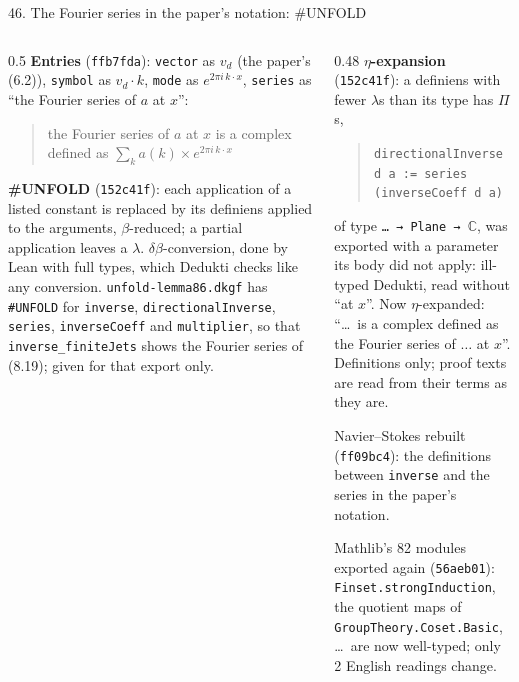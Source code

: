 \documentclass[10pt,aspectratio=169]{beamer}
\newcommand{\bad}[1]{\textcolor{warn}{#1}}
\newcommand{\ok}[1]{\textcolor{good}{#1}}
\newcommand{\commit}[1]{\texttt{\footnotesize #1}}
\begin{document}
\begin{frame}{46. The Fourier series in the paper's notation: \#UNFOLD}
  \scriptsize
  \begin{columns}[T]
    \begin{column}{0.5\textwidth}
      \textbf{Entries} (\commit{ffb7fda}): \texttt{vector} as $v_d$ (the paper's (6.2)),
      \texttt{symbol} as $v_d \cdot k$, \texttt{mode} as $e^{2\pi i\, k \cdot x}$,
      \texttt{series} as ``the Fourier series of $a$ at $x$'':
      \begin{quote}
        \ok{the Fourier series of $a$ at $x$ is a complex defined as
        $\sum_k a(k) \times e^{2\pi i\, k \cdot x}$}
      \end{quote}
      \textbf{\#UNFOLD} (\commit{152c41f}): each application of a listed constant is replaced by
      its definiens applied to the arguments, $\beta$-reduced; a partial application leaves a
      $\lambda$. $\delta\beta$-conversion, done by Lean with full types, which Dedukti checks like
      any conversion. \texttt{unfold-lemma86.dkgf} has \texttt{\#UNFOLD} for \texttt{inverse},
      \texttt{directionalInverse}, \texttt{series}, \texttt{inverseCoeff} and
      \texttt{multiplier}, so that \texttt{inverse\_finiteJets} shows the Fourier series of (8.19); given for that
      export only.
    \end{column}
    \begin{column}{0.48\textwidth}
      \textbf{$\eta$-expansion} (\commit{152c41f}): a definiens with fewer $\lambda$s than its type
      has $\Pi$s,
      \begin{quote}
        \texttt{directionalInverse d a := series (inverseCoeff d a)}
      \end{quote}
      of type \texttt{\ldots\ → Plane → $\mathbb{C}$}, was exported with a parameter its body did not apply:
      \bad{ill-typed} Dedukti, read without ``at $x$''. Now $\eta$-expanded: ``\ok{\ldots\ is a
      complex defined as the Fourier series of $\ldots$ at $x$}''. Definitions only; proof texts
      are read from their terms as they are.

      \vspace{1mm}
      Navier--Stokes rebuilt (\commit{ff09bc4}): the definitions between \texttt{inverse} and the
      series in the paper's notation.

      \vspace{1mm}
      Mathlib's 82 modules exported again (\commit{56aeb01}): \texttt{Finset.strongInduction},
      the quotient maps of \texttt{GroupTheory.Coset.Basic}, \ldots\ are now well-typed;
      only 2 English readings change.
    \end{column}
  \end{columns}
\end{frame}
\end{document}

